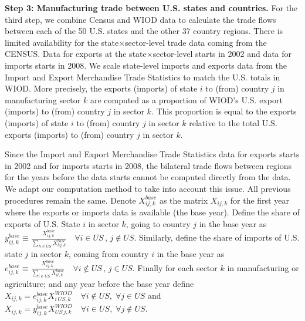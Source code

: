 \documentclass[12pt]{article}
\begin{document}
\textbf{Step 3: Manufacturing trade between U.S. states and countries.} For the third step, we combine Census and WIOD data to calculate the trade flows between each of the 50 U.S. states and the other 37 country regions. There is limited availability for the state$\times$sector-level trade data coming from the  CENSUS. Data for exports at the state$\times$sector-level starts in 2002 and data for imports starts in 2008. We scale state-level imports and exports data from the Import and Export Merchandise Trade Statistics to match the U.S. totals in WIOD. More precisely, the exports (imports) of state $i$ to (from) country $j$ in manufacturing sector $k$ are computed as a proportion of WIOD's U.S. export (imports) to (from) country $j$ in sector $k$. This proportion is equal to the exports (imports) of state $i$ to (from) country $j$ in sector $k$ relative to the total U.S. exports (imports) to (from) country $j$ in sector $k$.

Since the Import and Export Merchandise Trade Statistics data for exports starts in 2002 and for imports starts in 2008, the bilateral trade flows between regions for the years before the data starts cannot be computed directly from the data. We adapt our computation method to take into account this issue. All previous procedures remain the same. Denote $X_{ij,k}^{base}$ as the matrix $X_{ij,k}$ for the first year where the exports or imports data is available (the base year). Define the share of exports of U.S. State $i$ in sector $k$, going to country $j$ in the base year as $y_{ij,k}^{base}\equiv\tfrac{X_{ij,k}^{base}}{\sum_{h\in US}X_{hj,k}^{base}} \quad \forall i\in US \, , \, j\notin US.$ Similarly, define the share of imports of U.S. state $j$ in sector $k$, coming from country $i$ in the base year as $e_{ij,k}^{base}\equiv\tfrac{X_{ij,k}^{base}}{\sum_{l\in US}X_{il,k}^{base}} \quad \forall i\notin US \, , \, j\in US.$ Finally for each sector $k$ in manufacturing or agriculture; and any year before the base year define $X_{ij,k}= e_{ij,k}^{base}X_{i\,US,k}^{WIOD} \quad \forall i\notin US, \; \forall j\in US$ and $X_{ij,k}=y_{ij,k}^{base}X_{US\,j,k}^{WIOD} \quad \forall i\in US, \; \forall j\notin US$.
\end{document}
